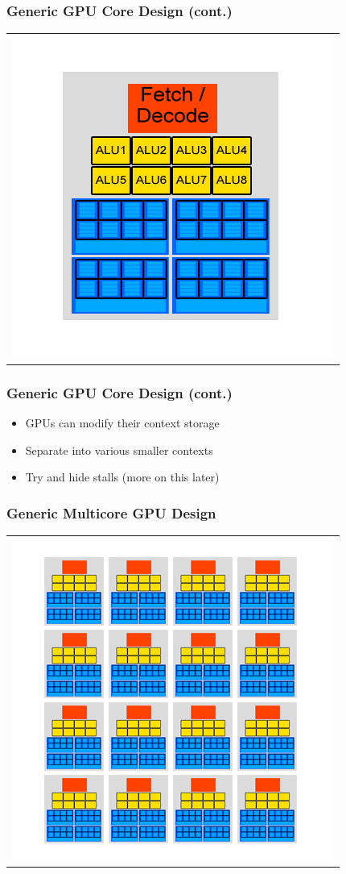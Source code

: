 \documentclass{beamer}
\begin{document}
\begin{frame}
	\frametitle{Generic GPU Core Design (cont.)}
	\begin{tabular}{c}
		\includegraphics[width=.75\textwidth]{GPU-Design---multiple-contexts.jpg}
	\end{tabular}
\end{frame}

\begin{frame}
	\frametitle{Generic GPU Core Design (cont.)}
	\begin{itemize}
		\item<1-> GPUs can modify their context storage 
		\item<2-> Separate into various smaller contexts
		\item<3-> Try and hide stalls (more on this later)
	\end{itemize}
\end{frame}

\begin{frame}
	\frametitle{Generic Multicore GPU Design}
	\begin{tabular}{c}
		\includegraphics[width=.75\textwidth]{GPU-Design---multiple-cores.jpg}
	\end{tabular}
\end{frame}
\end{document}
